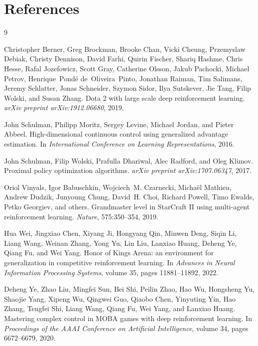 \documentclass{article}
\begin{document}
\section*{References}
\begin{thebibliography}{9}

Christopher Berner, Greg Brockman, Brooke Chan, Vicki Cheung, Przemyslaw Debiak,
Christy Dennison, David Farhi, Quirin Fischer, Shariq Hashme, Chris Hesse,
Rafal Jozefowicz, Scott Gray, Catherine Olsson, Jakub Pachocki, Michael Petrov,
Henrique~Pondé de~Oliveira~Pinto, Jonathan Raiman, Tim Salimans, Jeremy Schlatter,
Jonas Schneider, Szymon Sidor, Ilya Sutskever, Jie Tang, Filip Wolski, and Susan Zhang.
\newblock Dota 2 with large scale deep reinforcement learning.
\newblock \emph{arXiv preprint arXiv:1912.06680}, 2019.

John Schulman, Philipp Moritz, Sergey Levine, Michael Jordan, and Pieter Abbeel.
\newblock High-dimensional continuous control using generalized advantage estimation.
\newblock In \emph{International Conference on Learning Representations}, 2016.

John Schulman, Filip Wolski, Prafulla Dhariwal, Alec Radford, and Oleg Klimov.
\newblock Proximal policy optimization algorithms.
\newblock \emph{arXiv preprint arXiv:1707.06347}, 2017.

Oriol Vinyals, Igor Babuschkin, Wojciech~M. Czarnecki, Michaël Mathieu, Andrew Dudzik,
Junyoung Chung, David~H. Choi, Richard Powell, Timo Ewalds, Petko Georgiev, and others.
\newblock Grandmaster level in StarCraft II using multi-agent reinforcement learning.
\newblock \emph{Nature}, 575:350--354, 2019.

Hua Wei, Jingxiao Chen, Xiyang Ji, Hongyang Qin, Minwen Deng, Siqin Li, Liang Wang,
Weinan Zhang, Yong Yu, Lin Liu, Lanxiao Huang, Deheng Ye, Qiang Fu, and Wei Yang.
\newblock Honor of Kings Arena: an environment for generalization in competitive reinforcement learning.
\newblock In \emph{Advances in Neural Information Processing Systems}, volume 35, pages 11881--11892, 2022.

Deheng Ye, Zhao Liu, Mingfei Sun, Bei Shi, Peilin Zhao, Hao Wu, Hongsheng Yu,
Shaojie Yang, Xipeng Wu, Qingwei Guo, Qiaobo Chen, Yinyuting Yin, Hao Zhang,
Tengfei Shi, Liang Wang, Qiang Fu, Wei Yang, and Lanxiao Huang.
\newblock Mastering complex control in MOBA games with deep reinforcement learning.
\newblock In \emph{Proceedings of the AAAI Conference on Artificial Intelligence},
volume 34, pages 6672--6679, 2020.

\end{thebibliography}
\end{document}
